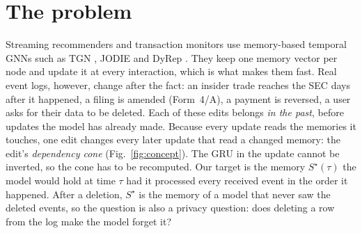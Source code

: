 \documentclass{article}
\begin{document}
\section{The problem}
\label{sec:problem}

Streaming recommenders and transaction monitors use memory-based temporal GNNs such as TGN \citep{rossi2020tgn},
JODIE \citep{kumar2019jodie} and DyRep \citep{trivedi2019dyrep}. They keep one memory vector per node and update it at
every interaction, which is what makes them fast. Real event logs, however, change after the fact: an insider trade
reaches the SEC days after it happened, a filing is amended (Form~4/A), a payment is reversed, a user asks for their
data to be deleted. Each of these edits belongs \emph{in the past}, before updates the model has already made. Because
every update reads the memories it touches, one edit changes every later update that read a changed memory: the edit's
\emph{dependency cone} (Fig.~\ref{fig:concept}). The GRU in the update cannot be inverted, so the cone has to be
recomputed. Our target is the memory $S^\star(\tau)$ the model would hold at time $\tau$ had it processed every received
event in the order it happened. After a deletion, $S^\star$ is the memory of a model that never saw the deleted events, so
the question is also a privacy question: does deleting a row from the log make the model forget it?
\end{document}
